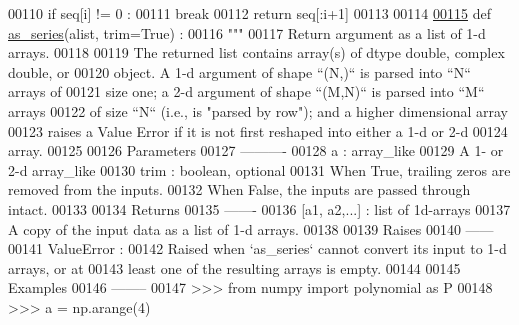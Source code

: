 \begin{DoxyCode}
00110             \textcolor{keywordflow}{if} seq[i] != 0 :
00111                 \textcolor{keywordflow}{break}
00112         \textcolor{keywordflow}{return} seq[:i+1]
00113 
00114 
\hypertarget{polyutils_8py_source_l00115}{}\hyperlink{namespacepyneb_1_1utils_1_1polyutils_a9c3751d438f0f75922155c7823fe2699}{00115} \textcolor{keyword}{def }\hyperlink{namespacepyneb_1_1utils_1_1polyutils_a9c3751d438f0f75922155c7823fe2699}{as\_series}(alist, trim=True) :
00116     \textcolor{stringliteral}{"""}
00117 \textcolor{stringliteral}{    Return argument as a list of 1-d arrays.}
00118 \textcolor{stringliteral}{}
00119 \textcolor{stringliteral}{    The returned list contains array(s) of dtype double, complex double, or}
00120 \textcolor{stringliteral}{    object.  A 1-d argument of shape ``(N,)`` is parsed into ``N`` arrays of}
00121 \textcolor{stringliteral}{    size one; a 2-d argument of shape ``(M,N)`` is parsed into ``M`` arrays}
00122 \textcolor{stringliteral}{    of size ``N`` (i.e., is "parsed by row"); and a higher dimensional array}
00123 \textcolor{stringliteral}{    raises a Value Error if it is not first reshaped into either a 1-d or 2-d}
00124 \textcolor{stringliteral}{    array.}
00125 \textcolor{stringliteral}{}
00126 \textcolor{stringliteral}{    Parameters}
00127 \textcolor{stringliteral}{    ----------}
00128 \textcolor{stringliteral}{    a : array\_like}
00129 \textcolor{stringliteral}{        A 1- or 2-d array\_like}
00130 \textcolor{stringliteral}{    trim : boolean, optional}
00131 \textcolor{stringliteral}{        When True, trailing zeros are removed from the inputs.}
00132 \textcolor{stringliteral}{        When False, the inputs are passed through intact.}
00133 \textcolor{stringliteral}{}
00134 \textcolor{stringliteral}{    Returns}
00135 \textcolor{stringliteral}{    -------}
00136 \textcolor{stringliteral}{    [a1, a2,...] : list of 1d-arrays}
00137 \textcolor{stringliteral}{        A copy of the input data as a list of 1-d arrays.}
00138 \textcolor{stringliteral}{}
00139 \textcolor{stringliteral}{    Raises}
00140 \textcolor{stringliteral}{    ------}
00141 \textcolor{stringliteral}{    ValueError :}
00142 \textcolor{stringliteral}{        Raised when `as\_series` cannot convert its input to 1-d arrays, or at}
00143 \textcolor{stringliteral}{        least one of the resulting arrays is empty.}
00144 \textcolor{stringliteral}{}
00145 \textcolor{stringliteral}{    Examples}
00146 \textcolor{stringliteral}{    --------}
00147 \textcolor{stringliteral}{    >>> from numpy import polynomial as P}
00148 \textcolor{stringliteral}{    >>> a = np.arange(4)}

\end{DoxyCode}
